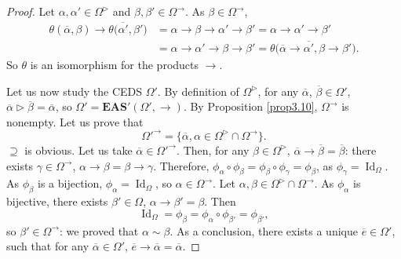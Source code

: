 \documentclass[10pt,a4paper]{amsart}
\numberwithin{equation}{section}
\newcommand{\eas}{\mathbf{EAS}}
\begin{document}
\begin{proof}
Let $\alpha,\alpha'\in \Omega^\triangleright$ and $\beta,\beta'\in \Omega^\rightarrow$. As $\beta\in \Omega^\rightarrow$,
\begin{align*}
\theta(\overline{\alpha},\beta)\rightarrow \theta\bigl(\overline{\alpha'},\beta'\bigr)&=\alpha \rightarrow \beta \rightarrow \alpha' \rightarrow \beta'=\alpha \rightarrow \alpha' \rightarrow \beta'\\
&=\alpha \rightarrow \alpha' \rightarrow \beta \rightarrow\beta'=\theta\bigl(\overline{\alpha}\rightarrow \overline{\alpha'},\beta \rightarrow \beta'\bigr).
\end{align*}
So $\theta$ is an isomorphism for the products $\rightarrow$.

Let us now study the CEDS $\Omega'$. By definition of $\Omega^\triangleright$, for any $\overline{\alpha}$, $\overline{\beta}\in \Omega'$, $\overline{\alpha}\triangleright \overline{\beta}=\overline{\alpha}$, so $\Omega'=\eas'(\Omega',\rightarrow)$.
By Proposition \ref{prop3.10}, $\Omega^\rightarrow$ is nonempty. Let us prove that
\[\Omega'^\rightarrow=\big\{\overline{\alpha}, \alpha\in \Omega^\triangleright\cap \Omega^\rightarrow\big\}.\]
$\supseteq$ is obvious. Let us take $\overline{\alpha}\in \Omega'^\rightarrow$. Then, for any $\beta \in \Omega^\triangleright$, $\overline{\alpha}\rightarrow\overline{\beta}=\overline{\beta}$:
there exists $\gamma \in \Omega^\rightarrow$, $\alpha \rightarrow \beta=\beta \rightarrow \gamma$. Therefore,
$\phi_\alpha\circ \phi_\beta=\phi_\beta \circ \phi_\gamma=\phi_\beta$,
as $\phi_\gamma=\operatorname{Id}_\Omega$. As $\phi_\beta$ is a bijection, $\phi_\alpha=\operatorname{Id}_\Omega$, so $\alpha \in \Omega^\rightarrow$. Let $\alpha,\beta \in \Omega^\triangleright\cap \Omega^\rightarrow$.
As $\phi_\alpha$ is bijective, there exists $\beta'\in \Omega$, $\alpha \rightarrow \beta'=\beta$. Then
\[ \operatorname{Id}_\Omega=\phi_\beta=\phi_\alpha\circ \phi_{\beta'}=\phi_{\beta'},\]
so $\beta'\in \Omega^\rightarrow$: we proved that $\alpha \sim \beta$. As a conclusion, there exists a unique $\overline{e}\in \Omega'$, such that for any $\overline{\alpha}\in \Omega'$, $\overline{e}\rightarrow \overline{\alpha}=\overline{\alpha}$.


\end{proof}
\end{document}
